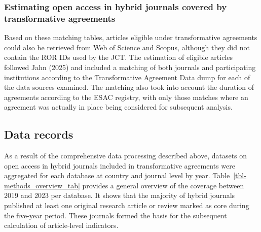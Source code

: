 \documentclass[a4paper,man,floatsintext,longtable,noextraspace,10pt]{apa6}
\begin{document}
\subsubsection{Estimating open access in hybrid journals covered by
transformative
agreements}\label{estimating-open-access-in-hybrid-journals-covered-by-transformative-agreements}

Based on these matching tables, articles eligible under transformative
agreements could also be retrieved from Web of Science and Scopus,
although they did not contain the ROR IDs used by the JCT. The
estimation of eligible articles followed Jahn (2025) and included a
matching of both journals and participating institutions according to
the Transformative Agreement Data dump for each of the data sources
examined. The matching also took into account the duration of agreements
according to the ESAC registry, with only those matches where an
agreement was actually in place being considered for subsequent
analysis.

\subsection{Data records}\label{data-records}

As a result of the comprehensive data processing described above,
datasets on open access in hybrid journals included in transformative
agreements were aggregated for each database at country and journal
level by year. Table~\ref{tbl-methods_overview_tab} provides a general
overview of the coverage between 2019 and 2023 per database. It shows
that the majority of hybrid journals published at least one original
research article or review marked as core during the five-year period.
These journals formed the basis for the subsequent calculation of
article-level indicators.
\end{document}
